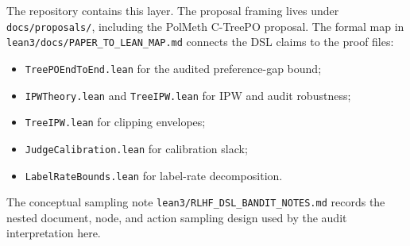 The repository contains this layer. The proposal framing lives under
\texttt{docs/proposals/}, including the PolMeth C-TreePO proposal. The formal
map in \texttt{lean3/docs/PAPER\_TO\_LEAN\_MAP.md} connects the DSL claims to
the proof files:
\begin{itemize}[leftmargin=1.4em,itemsep=2pt]
  \item \texttt{TreePOEndToEnd.lean} for the audited preference-gap bound;
  \item \texttt{IPWTheory.lean} and \texttt{TreeIPW.lean} for IPW and audit
  robustness;
  \item \texttt{TreeIPW.lean} for clipping envelopes;
  \item \texttt{JudgeCalibration.lean} for calibration slack;
  \item \texttt{LabelRateBounds.lean} for label-rate decomposition.
\end{itemize}
The conceptual sampling note \texttt{lean3/RLHF\_DSL\_BANDIT\_NOTES.md}
records the nested document, node, and action sampling design used by the
audit interpretation here.
